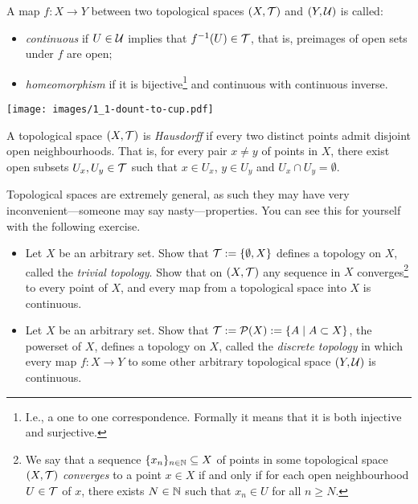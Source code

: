 \begin{definition}
  A map $f: X \to Y$ between two topological spaces $(X,\mathcal{T})$ and $(Y, \mathcal{U})$ is called:
  \begin{itemize}
    \item \emph{continuous} if $U\in\mathcal{U}$ implies that $f^{-1}(U)\in\mathcal{T}$, that is, preimages of open sets under $f$ are open;
    \item \emph{homeomorphism} if it is bijective\footnote{I.e., a one to one correspondence. Formally it means that it is both injective and surjective.} and continuous with continuous inverse.
  \end{itemize}
\end{definition}

\begin{marginfigure}
  \texttt{[image: images/1\_1-dount-to-cup.pdf]}
  \vspace{5pt}
\end{marginfigure}

\begin{definition}
  A topological space $(X, \mathcal{T})$ is \emph{Hausdorff} if every two distinct points admit disjoint open neighbourhoods. That is, for every pair $x\neq y$ of points in $X$, there exist open subsets $U_x, U_y\in\mathcal{T}$ such that $x\in U_x$, $y\in U_y$ and $U_x \cap U_y = \emptyset$.
\end{definition}

Topological spaces are extremely general, as such they may have very inconvenient---someone may say nasty---properties.
You can see this for yourself with the following exercise.

\begin{exercise}
  \begin{itemize}
    \item Let $X$ be an arbitrary set. Show that $\mathcal{T}:=\{\emptyset, X\}$ defines a topology on $X$, called the \emph{trivial topology}. Show that on $(X, \mathcal{T})$ any sequence in $X$ converges\footnote{We say that a sequence $\{x_n\}_{n\in\mathbb{N}}\subseteq X$ of points in some topological space $(X, \mathcal{T})$ \emph{converges} to a point $x\in X$ if and only if for each open neighbourhood $U\in\mathcal{T}$ of $x$, there exists $N\in\mathbb{N}$ such that $x_n\in U$ for all $n\geq N$.} to every point of $X$, and every map from a topological space into $X$ is continuous.
    \item Let $X$ be an arbitrary set. Show that $\mathcal{T}:=\mathcal{P}(X) := \{ A \mid A\subset X \}$, the powerset of $X$, defines a topology on $X$, called the \emph{discrete topology} in which every map $f : X \to Y$ to some other arbitrary topological space $(Y, \mathcal{U})$ is continuous.
  \end{itemize}
\end{exercise}


